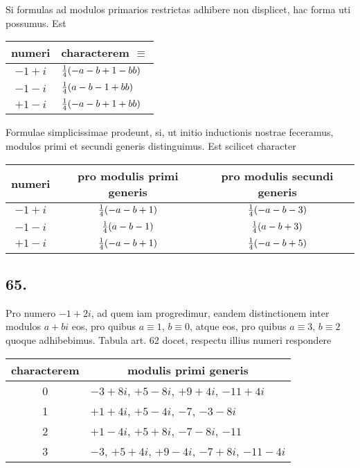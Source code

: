 \documentclass[twoside,12pt, showframe]{memoir}
\let\oldfrac\frac
\def\frac#1#2{\mathchoice{\tfrac{#1}{#2}}{\oldfrac{#1}{#2}}{\genfrac{}{}{}{2}{#1}{#2\mathstrut}}{\genfrac{}{}{}{3}{#1}{#2\mathstrut}}}
\begin{document}
Si formulas ad modulos primarios restrictas adhibere non displicet, hac forma uti possumus. Est
\begin{center}
\begin{tabular}{c|l}
numeri &\multicolumn{1}{c}{ characterem \(\equiv\)} \\
\hline
\(-1+i\) & \(\frac{1}{4}(-a-b+1-b b)\) \\
\(-1-i\) & \(\frac{1}{4}(a-b-1+b b)\) \\
\(+1-i\) & \(\frac{1}{4}(-a-b+1+b b)\) \\
\end{tabular}
\end{center}
Formulae simplicissimae prodeunt, si, ut initio inductionis nostrae feceramus, modulos primi et secundi generis distinguimus. Est scilicet character
\begin{center}
\begin{tabular}{c|c|c}
numeri & pro modulis primi generis & pro modulis secundi generis \\
\hline
\(-1+i\) & \(\frac{1}{4}(-a-b+1)\) & \(\frac{1}{4}(-a-b-3)\) \\
\(-1-i\) & \(\frac{1}{4}(a-b-1)\) & \(\frac{1}{4}(a-b+3)\) \\
\(+1-i\) & \(\frac{1}{4}(-a-b+1)\) & \(\frac{1}{4}(-a-b+5)\) \\
\end{tabular}
\end{center}

\subsection*{65.}
 
Pro numero \(-1+2 i\), ad quem iam progredimur, eandem distinctionem inter modulos \(a+b i\) eos, pro quibus \(a \equiv 1\), \( b \equiv 0\), atque eos, pro quibus \(a \equiv 3\), \( b \equiv 2\) quoque adhibebimus. Tabula art. 62 docet, respectu illius numeri respondere\clearpage\noindent%
\begin{center}
\begin{tabular}{c|l}
characterem & \multicolumn{1}{c}{modulis primi generis} \\
\hline
0 & \(-3+8 i\), \(+5-8 i\), \(+9+4 i\), \(-11+4 i\) \\
1 & \(+1+4 i\), \(+5-4 i\), \(-7\), \(-3-8 i\) \\
2 & \(+1-4 i\), \(+5+8 i\), \(-7-8 i\), \(-11\) \\
3 & \(-3\), \(+5+4 i\), \(+9-4 i\), \(-7+8 i\), \(-11-4 i\) \\
\end{tabular}
\end{center}
 
\end{document}
